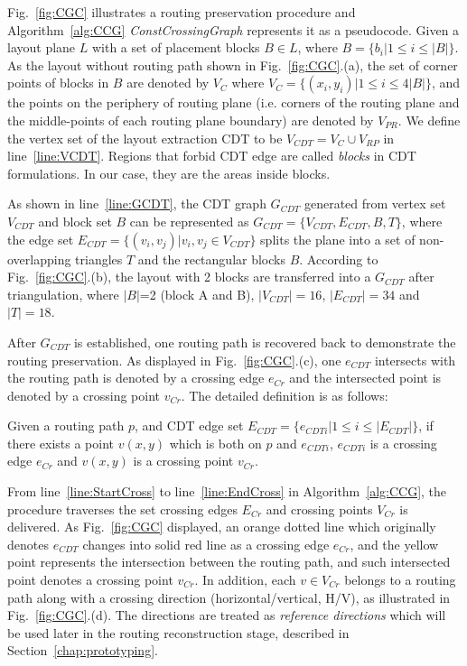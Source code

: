     Fig.~\ref{fig:CGC} illustrates a routing preservation procedure and Algorithm~\ref{alg:CCG} {\it ConstCrossingGraph} represents it as a pseudocode. Given a layout plane $L$ with a set of placement blocks $B \in L$, where $B = \{b_i|1 \leq i \leq |B|\}$. As the layout without routing path shown in Fig.~\ref{fig:CGC}.(a), the set of corner points of blocks in $B$ are denoted by $V_C$ where $V_C = \{(x_i,y_i)|1 \leq i \leq 4|B|\}$, and the points on the periphery of routing plane (i.e. corners of the routing plane and the middle-points of each routing plane boundary) are denoted by $V_{PR}$. We define the vertex set of the layout extraction CDT to be $V_{CDT} = V_C \cup V_{RP}$ in line~\ref{line:VCDT}. Regions that forbid CDT edge are called {\it blocks} in CDT formulations. In our case, they are the areas inside blocks.


    As shown in line~\ref{line:GCDT}, the CDT graph $G_{CDT}$ generated from vertex set $V_{CDT}$ and block set $B$ can be represented as $G_{CDT} = \{V_{CDT},E_{CDT},B,T\}$, where the edge set $E_{CDT} = \{(v_i,v_j)|v_i,v_j\in V_{CDT}\}$ splits the plane into a set of non-overlapping triangles $T$ and the rectangular blocks $B$. According to Fig.~\ref{fig:CGC}.(b), the layout with 2 blocks are transferred into a $G_{CDT}$ after triangulation, where $|B|$=2 (block A and B), $|V_{CDT}|=16$, $|E_{CDT}|=34$ and $|T|=18$.


    After $G_{CDT}$ is established, one routing path is recovered back to demonstrate the routing preservation. As displayed in Fig.~\ref{fig:CGC}.(c), one $e_{CDT}$ intersects with the routing path is denoted by a crossing edge $e_{Cr}$ and the intersected point is denoted by a crossing point $v_{Cr}$. The detailed definition is as follows:

     
    \begin{defi}\label{defi:CrossingPoint}
      Given a routing path $p$, and CDT edge set $E_{CDT}= \{e_{CDTi}| 1 \leq i\leq|E_{CDT}|\}$, if there exists a point $v(x,y)$ which is both on $p$ and $e_{CDTi}$, $e_{CDTi}$ is a crossing edge $e_{Cr}$ and $v(x,y)$ is a crossing point $v_{Cr}$.
    \end{defi}

    From line~\ref{line:StartCross} to line~\ref{line:EndCross} in Algorithm~\ref{alg:CCG}, the procedure traverses the set crossing edges $E_{Cr}$ and crossing points $V_{Cr}$ is delivered. As Fig.~\ref{fig:CGC} displayed, an orange dotted line which originally denotes $e_{CDT}$ changes into solid red line as a crossing edge $e_{Cr}$, and the yellow point represents the intersection between the routing path, and such intersected point denotes a crossing point $v_{Cr}$. In addition, each $v \in V_{Cr}$ belongs to a routing path along with a crossing direction (horizontal/vertical, H/V), as illustrated in Fig.~\ref{fig:CGC}.(d). The directions are treated as {\it reference directions} which will be used later in the routing reconstruction stage, described in Section~\ref{chap:prototyping}. 



